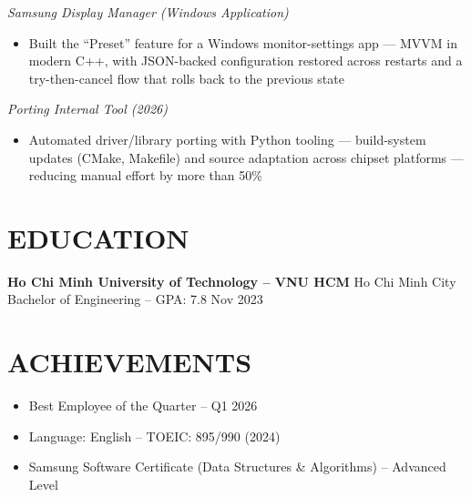\documentclass[a4paper,10pt]{article}
\newcommand{\project}[1]{\vspace{2pt}\textit{#1}\vspace{1pt}}
\begin{document}
\project{Samsung Display Manager (Windows Application)}
\begin{itemize}
    \item Built the ``Preset'' feature for a Windows monitor-settings app --- MVVM in modern C++,
          with JSON-backed configuration restored across restarts and a try-then-cancel flow
          that rolls back to the previous state
\end{itemize}

\project{Porting Internal Tool (2026)}
\begin{itemize}
    \item Automated driver/library porting with Python tooling --- build-system updates
          (CMake, Makefile) and source adaptation across chipset platforms ---
          reducing manual effort by more than 50\%
\end{itemize}

\section*{EDUCATION}
\textbf{Ho Chi Minh University of Technology -- VNU HCM} \hfill Ho Chi Minh City \\
Bachelor of Engineering -- GPA: 7.8 \hfill Nov 2023

\section*{ACHIEVEMENTS}
\begin{itemize}
    \item Best Employee of the Quarter -- Q1 2026
    \item Language: English -- TOEIC: 895/990 (2024)
    \item Samsung Software Certificate (Data Structures \& Algorithms) -- Advanced Level
\end{itemize}
\end{document}
